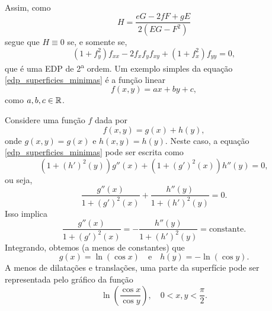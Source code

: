 \begin{exemplo}
\begin{align*}
	\end{align*}
	Assim, como
	\begin{equation*}
	H = \frac{eG - 2fF + gE}{2(EG - F^2)}
	\end{equation*}
	segue que $H \equiv 0$ se, e somente se,
	\begin{equation}\label{edp_superficies_minimas}
	(1 + f_y^2) f_{xx}  - 2 f_x f_y f_{xy} + (1+f_x^2) f_{yy} = 0,
	\end{equation}
	que é uma EDP de 2\textsuperscript{a} ordem.
	Um exemplo simples da equação \eqref{edp_superficies_minimas} é a função linear
	\begin{equation*}
	f(x,y) = ax + by + c,
	\end{equation*}
	como $a, b, c \in \mathbb{R}$.
\end{exemplo}

\begin{exemplo}
	Considere uma função $f$ dada por
	\begin{equation*}
	f(x,y) = g(x) + h(y),
	\end{equation*}
	onde  $g(x,y)=g(x)$ e $h(x,y)=h(y)$. Neste caso, a equação \eqref{edp_superficies_minimas} pode ser escrita como
	\begin{equation*}
	(1 + (h')^2(y)) g''(x) + (1 + (g')^2(x)) h''(y) = 0,
	\end{equation*}
	ou seja,
	\begin{equation*}
	\frac{g''(x)}{1 + (g')^2(x)} + \frac{h''(y)}{1 + (h')^2(y)} = 0.
	\end{equation*}
	Isso implica
	\begin{equation*}
	\frac{g''(x)}{1 + (g')^2(x)} = - \frac{h''(y)}{1 + (h')^2(y)} = \text{constante}.
	\end{equation*}
	Integrando, obtemos (a menos de constantes) que
	\begin{equation*}
	g(x) = \ln (\cos x) \quad \text{e} \quad h(y) = -\ln (\cos y).
	\end{equation*}
	A menos de dilatações e translações, uma parte da superfície pode ser representada pelo gráfico da função
	\begin{equation*}
	\ln \left( \frac{\cos x}{\cos y} \right), \quad 0 < x,y < \frac{\pi}{2}.
	\end{equation*}
\end{exemplo}


